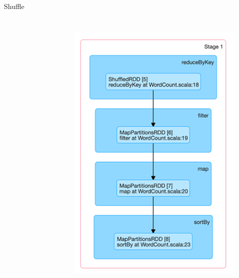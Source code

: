 \begin{frame}[plain,t]{Shuffle}
\begin{columns}[c]
\begin{figure}
	\end{figure}
	\column{4cm}  %
	\begin{figure}
		\centering
		\includegraphics[width=1\linewidth]{images/p008}
		\label{fig:p008}
	\end{figure}
\end{columns}
	
\end{frame}



